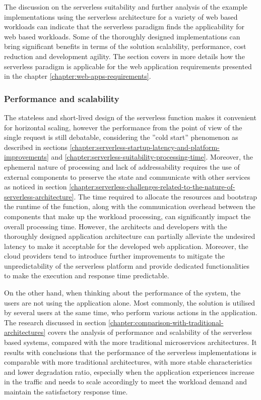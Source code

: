 The discussion on the serverless suitability and further analysis of the example implementations using the serverless architecture for a variety of web based workloads can indicate that the serverless paradigm finds the applicability for web based workloads.
Some of the thoroughly designed implementations can bring significant benefits in terms of the solution scalability, performance, cost reduction and development agility.
The section covers in more details how the serverless paradigm is applicable for the web application requirements presented in the chapter \ref{chapter:web-apps-requirements}.

\subsubsection{Performance and scalability} \label{chapter:serverless-suitability-performance-and-scalability}

The stateless and short-lived design of the serverless function makes it convenient for horizontal scaling, however the performance from the point of view of the single request is still debatable, considering the ''cold start'' phenomenon as described in sections  \ref{chapter:serverless-startup-latency-and-platform-improvements} and \ref{chapter:serverless-suitability-processing-time}.
Moreover, the ephemeral nature of processing and lack of addressability requires the use of external components to preserve the state and communicate with other services as noticed in section \ref{chapter:serverless-challenges-related-to-the-nature-of-serverless-architecture}.
The time required to allocate the resources and bootstrap the runtime of the function, along with the communication overhead between the components that make up the workload processing, can significantly impact the overall processing time.
However, the architects and developers with the thoroughly designed application architecture can partially alleviate the undesired latency to make it acceptable for the developed web application.
Moreover, the cloud providers tend to introduce further improvements to mitigate the unpredictability of the serverless platform and provide dedicated functionalities to make the execution and response time predictable.

On the other hand, when thinking about the performance of the system, the users are not using the application alone.
Most commonly, the solution is utilised by several users at the same time, who perform various actions in the application.
The research discussed in section \ref{chapter:comparison-with-traditional-architectures} covers the analysis of performance and scalability of the serverless based systems, compared with the more traditional microservices architectures.
It results with conclusions that the performance of the serverless implementations is comparable with more traditional architectures, with more stable characteristics and lower degradation ratio, especially when the application experiences increase in the traffic and needs to scale accordingly to meet the workload demand and maintain the satisfactory response time.

